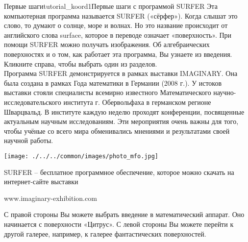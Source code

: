 \begin{surferIntroPage}{Первые шаги}{tutorial_koord1}{Первые шаги с программой SURFER}
Эта компьютерная программа называется SURFER («сёрфер»). Когда слышат это слово, то думают о солнце, море и волнах. Но это название происходит от английского слова surface, которое в переводе означает «поверхность». При помощи SURFER можно получать изображения. Об алгебраических поверхностях и о том, как работает эта программа, Вы узнаете из введения. Кликните справа, чтобы выбрать один из разделов.
\\
Программа SURFER демонстрируется в рамках выставки IMAGINARY. Она была создана в рамках Года математики в Германии (2008 г.). У истоков выставки стояли специалисты всемирно известного Математического научно-исследовательского института г. Обервольфаха в германском регионе Шварцвальд. В институте каждую неделю проходят конференции, посвященные актуальным научным исследованиям. Эти мероприятия очень важны для того, чтобы учёные со всего мира обменивались мнениями и результатами своей научной работы.
\vspace{-1ex}
\begin{center}
\texttt{[image: ./../../common/images/photo\_mfo.jpg]}
\end{center}
\vspace{-2ex}
SURFER – бесплатное программное обеспечение, которое можно скачать на интернет-сайте выставки
\vspace{-3ex}
\begin{center}
www.imaginary-exhibition.com
\end{center}
\vspace{-2ex}
С правой стороны Вы можете выбрать введение в математический аппарат. Оно начинается с поверхности «Цитрус». С левой стороны Вы можете перейти к другой галерее, например, к галерее фантастических поверхностей.
\end{surferIntroPage}

